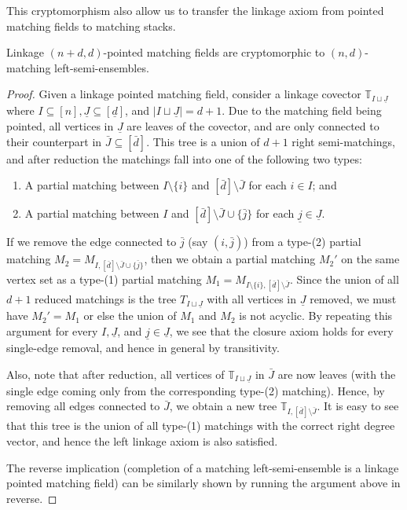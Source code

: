 \documentclass[letterpaper,reqno,11pt]{amsart}
\begin{document}
This cryptomorphism also allow us to transfer the linkage axiom from pointed matching fields to matching stacks.

\begin{theorem}\label{thm:fieldstack}
    Linkage $(n+d, d)$-pointed matching fields are cryptomorphic to $(n,d)$-matching left-semi-ensembles.
\end{theorem}

\begin{proof}
    Given a linkage pointed matching field, consider a linkage covector $\mathbb{T}_{I\sqcup \underline{J}}$ where $I\subseteq [n], \underline{J}\subseteq [\underline{d}]$, and $|I \sqcup \underline{J}| = d + 1$. Due to the matching field being pointed, all vertices in $\underline{J}$ are leaves of the covector, and are only connected to their counterpart in $\bar{J}\subseteq [\bar{d}]$. This tree is a union of $d+1$ right semi-matchings, and after reduction the matchings fall into one of the following two types:\begin{enumerate}
        \item A partial matching between $I\setminus \{i\}$ and $[\bar{d}]\setminus \bar{J}$ for each $i\in I$; and
        \item A partial matching between $I$ and $[\bar{d}]\setminus \bar{J} \cup \{\bar{j}\}$ for each $\underline{j}\in \underline{J}$.
    \end{enumerate}
    If we remove the edge connected to $\bar{j}$ (say $(i, \bar{j})$) from a type-(2) partial matching $M_2 = M_{I, [\bar{d}]\setminus \bar{J} \cup \{\bar{j}\}}$, then we obtain a partial matching $M_2'$ on the same vertex set as a type-(1) partial matching $M_1 = M_{I\setminus\{i\}, [\bar{d}]\setminus\bar{J}}$. Since the union of all $d+1$ reduced matchings is the tree $T_{I\sqcup \underline{J}}$ with all vertices in $\underline{J}$ removed, we must have $M_2' = M_1$ or else the union of $M_1$ and $M_2$ is not acyclic. By repeating this argument for every $I, \underline{J}$, and $\underline{j}\in \underline{J}$, we see that the closure axiom holds for every single-edge removal, and hence in general by transitivity.

    Also, note that after reduction, all vertices of $\mathbb{T}_{I\sqcup \underline{J}}$ in $\bar{J}$ are now leaves (with the single edge coming only from the corresponding type-(2) matching). Hence, by removing all edges connected to $\bar{J}$, we obtain a new tree $\mathbb{T}_{I, [\bar{d}]\setminus\bar{J}}$. It is easy to see that this tree is the union of all type-(1) matchings with the correct right degree vector, and hence the left linkage axiom is also satisfied.

    The reverse implication (completion of a matching left-semi-ensemble is a linkage pointed matching field) can be similarly shown by running the argument above in reverse. 
\end{proof}
\end{document}
